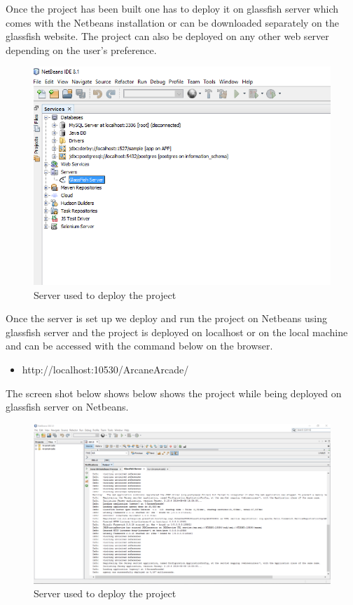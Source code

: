 \documentclass[english]{article}
\begin{document}
  
  Once the project has been built one has to deploy it on glassfish server which comes with the Netbeans installation or can be downloaded separately on the glassfish website.
  The project can also be deployed on any other web server depending on the user's preference.
  \begin{figure}[H]
    \includegraphics[width=1.0\textwidth]{glassfish.png}
  	\caption{Server used to deploy the project}
  \end{figure}
    
  
	Once the server is set up we deploy and run the project on Netbeans using glassfish server and the project is deployed on localhost or on the local machine and can be accessed with the command below on the browser.
  
    \begin{itemize}
    	
    	\item http://localhost:10530/ArcaneArcade/
    	
    \end{itemize}
  
  The screen shot below shows below shows the project while being deployed on glassfish server on Netbeans.
   \begin{figure}[H]
   	\includegraphics[width=1.0\textwidth]{deploy.png}
   	\caption{Server used to deploy the project}
   \end{figure}
 
\end{document}
